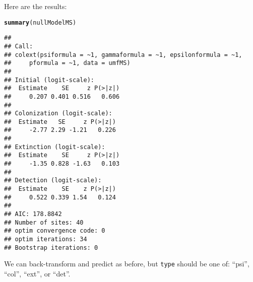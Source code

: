 \documentclass[12pt]{article}\usepackage[]{graphicx}\usepackage[]{color}
\makeatletter
\newcommand{\hlstd}[1]{\textcolor[rgb]{0.345,0.345,0.345}{#1}}%
\newcommand{\hlkwd}[1]{\textcolor[rgb]{0.737,0.353,0.396}{\textbf{#1}}}%
\newenvironment{kframe}{%
 \def\at@end@of@kframe{}%
 \ifinner\ifhmode%
  \def\at@end@of@kframe{\end{minipage}}%
  \begin{minipage}{\columnwidth}%
 \fi\fi%
 \def\FrameCommand##1{\hskip\@totalleftmargin \hskip-\fboxsep
 \colorbox{shadecolor}{##1}\hskip-\fboxsep
     \hskip-\linewidth \hskip-\@totalleftmargin \hskip\columnwidth}%
 \MakeFramed {\advance\hsize-\width
   \@totalleftmargin\z@ \linewidth\hsize
   \@setminipage}}%
 {\par\unskip\endMakeFramed%
 \at@end@of@kframe}
\newenvironment{knitrout}{}{} %
\makeatother
\begin{document}
Here are the results:

\begin{knitrout}
\color{fgcolor}\begin{kframe}
\begin{alltt}
\hlkwd{summary}\hlstd{(nullModelMS)}
\end{alltt}
\begin{verbatim}
## 
## Call:
## colext(psiformula = ~1, gammaformula = ~1, epsilonformula = ~1, 
##     pformula = ~1, data = umfMS)
## 
## Initial (logit-scale):
##  Estimate    SE     z P(>|z|)
##     0.207 0.401 0.516   0.606
## 
## Colonization (logit-scale):
##  Estimate   SE     z P(>|z|)
##     -2.77 2.29 -1.21   0.226
## 
## Extinction (logit-scale):
##  Estimate    SE     z P(>|z|)
##     -1.35 0.828 -1.63   0.103
## 
## Detection (logit-scale):
##  Estimate    SE    z P(>|z|)
##     0.522 0.339 1.54   0.124
## 
## AIC: 178.8842 
## Number of sites: 40
## optim convergence code: 0
## optim iterations: 34 
## Bootstrap iterations: 0
\end{verbatim}
\end{kframe}
\end{knitrout}

We can back-transform and predict as before, but \texttt{type} should
be one of: ``psi'', ``col'', ``ext'', or ``det''.
\end{document}

